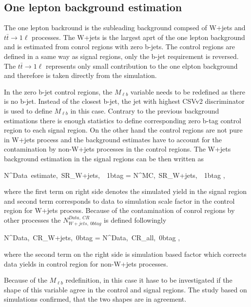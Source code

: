 \subsection{One lepton background estimation}


The  one lepton backround is the subleading background compsed of W+jets and $t\bar{t} \to 1\ell$ processes. The W+jets is the largest aprt of the one lepton background and is estimated from conrol regions with zero b-jets. The control regions are defined in a same way as signal regions, only the b-jet requirement is reversed. The   $t\bar{t} \to 1\ell$ represents only small contribution to the one elpton background and therefore is taken directly from the simulation.

In the zero b-jet control regions, the $M_{\ell b}$ variable needs to be redefined as there is no b-jet. Instead of the closest b-jet, the jet with highest CSVv2 discriminator is used to define $M_{\ell b}$ in this case. Contrary to the previous background estimations there is enough statistics to define corresponding zero b-tag control region to each signal region. On the other hand the control regions are not pure in W+jets process and the background estimates have to account for the contamination by non-W+jets processes in the control regions. The W+jets background estimation in the signal regions can be then written as

{
N^{Data~estimate,~SR}_{W+jets,~\geq~1btag}  = N^{MC,~SR}_{W+jets,~\geq~1btag} \times  {},
}

where the first term on right side denotes the simulated yield in the signal region and second term corresponds to data to simulation scale factor in the control region for W+jets process. Because of the contamination of conrol regions by other processes the $N^{Data,~CR}_{W+jets,~0btag}$ is defined followingly


{
N^{Data,~CR}_{W+jets,~0btag} = N^{Data,~CR}_{all,~0btag} \times {} ,
}

where the second term on the right side is simulation based factor which corrects data yields in control region for non-W+jets processes.

Because of the $M_{\ell b}$ redefinition, in this case it hase to be investigated if the shape of this variable agree in the control and signal regions. The study based on simulations confirmed, that the two shapes are in agreement. 


